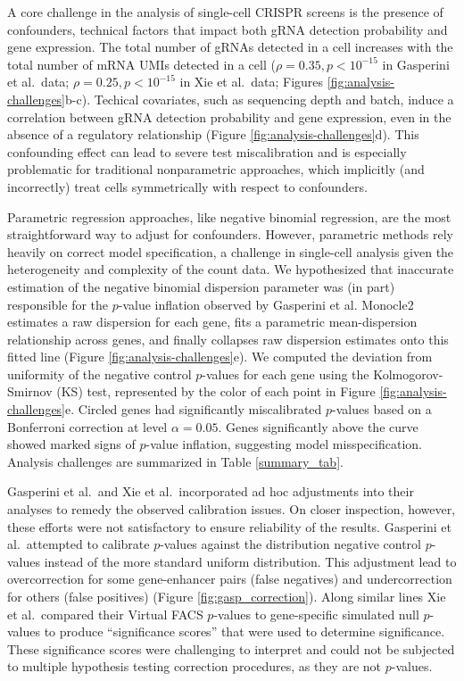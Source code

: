 \documentclass{article}
\begin{document}
A core challenge in the analysis of single-cell CRISPR screens is the presence of confounders, technical factors that impact both gRNA detection probability and gene expression. The total number of gRNAs detected in a cell increases with the total number of mRNA UMIs detected in a cell ($\rho = 0.35, p < 10^{-15}$ in Gasperini et al.\ data; $\rho = 0.25, p < 10^{-15}$ in Xie et al.\ data; Figures \ref{fig:analysis-challenges}b-c). Techical covariates, such as sequencing depth and batch, induce a correlation between gRNA detection probability and gene expression, even in the absence of a regulatory relationship (Figure \ref{fig:analysis-challenges}d). This confounding effect can lead to severe test miscalibration and is especially problematic for traditional nonparametric approaches, which implicitly (and incorrectly) treat cells symmetrically with respect to confounders.

Parametric regression approaches, like negative binomial regression, are the most straightforward way to adjust for confounders. However, parametric methods rely heavily on correct model specification, a challenge in single-cell analysis given the heterogeneity and complexity of the count data. We hypothesized that inaccurate estimation of the negative binomial dispersion parameter was (in part) responsible for the $p$-value inflation observed by Gasperini et al. Monocle2 estimates a raw dispersion for each gene, fits a parametric mean-dispersion relationship across genes, and finally collapses raw dispersion estimates onto this fitted line (Figure \ref{fig:analysis-challenges}e). We computed the deviation from uniformity of the negative control $p$-values for each gene using the Kolmogorov-Smirnov (KS) test, represented by the color of each point in Figure \ref{fig:analysis-challenges}e. Circled genes had significantly miscalibrated $p$-values based on a Bonferroni correction at level $\alpha = 0.05$. Genes significantly above the curve showed marked signs of $p$-value inflation, suggesting model misspecification. Analysis challenges are summarized in Table \ref{summary_tab}.

Gasperini et al.\ and Xie et al.\ incorporated ad hoc adjustments into their analyses to remedy the observed calibration issues. On closer inspection, however, these efforts were not satisfactory to ensure reliability of the results. Gasperini et al.\ attempted to calibrate $p$-values against the distribution negative control $p$-values instead of the more standard uniform distribution. This adjustment lead to overcorrection for some gene-enhancer pairs (false negatives) and undercorrection for others (false positives) (Figure \ref{fig:gasp_correction}).  Along similar lines Xie et al.\ compared their Virtual FACS $p$-values to gene-specific simulated null $p$-values to produce ``significance scores'' that were used to determine significance. These significance scores were challenging to interpret and could not be subjected to multiple hypothesis testing correction procedures, as they are not $p$-values.
\end{document}
